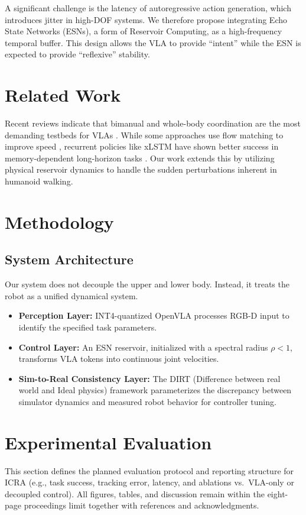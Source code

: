 \documentclass[conference]{IEEEtran}
\begin{document}
A significant challenge is the latency of autoregressive action generation, which introduces jitter in high-DOF systems. We therefore propose integrating Echo State Networks (ESNs), a form of Reservoir Computing, as a high-frequency temporal buffer. This design allows the VLA to provide ``intent'' while the ESN is expected to provide ``reflexive'' stability.

\section{Related Work}
Recent reviews indicate that bimanual and whole-body coordination are the most demanding testbeds for VLAs \cite{VLA_Review2026}. While some approaches use flow matching to improve speed \cite{Preprints2026}, recurrent policies like xLSTM have shown better success in memory-dependent long-horizon tasks \cite{Notes2Self2026}. Our work extends this by utilizing physical reservoir dynamics to handle the sudden perturbations inherent in humanoid walking.

\section{Methodology}
\subsection{System Architecture}
Our system does not decouple the upper and lower body. Instead, it treats the robot as a unified dynamical system.
\begin{itemize}
    \item \textbf{Perception Layer:} INT4-quantized OpenVLA processes RGB-D input to identify the specified task parameters.
    \item \textbf{Control Layer:} An ESN reservoir, initialized with a spectral radius $\rho < 1$, transforms VLA tokens into continuous joint velocities.
    \item \textbf{Sim-to-Real Consistency Layer:} The DIRT (Difference between real world and Ideal physics) framework parameterizes the discrepancy between simulator dynamics and measured robot behavior for controller tuning.
\end{itemize}

\section{Experimental Evaluation}
This section defines the planned evaluation protocol and reporting structure for ICRA (e.g., task success, tracking error, latency, and ablations vs.\ VLA-only or decoupled control). All figures, tables, and discussion remain within the eight-page proceedings limit together with references and acknowledgments.
\end{document}
